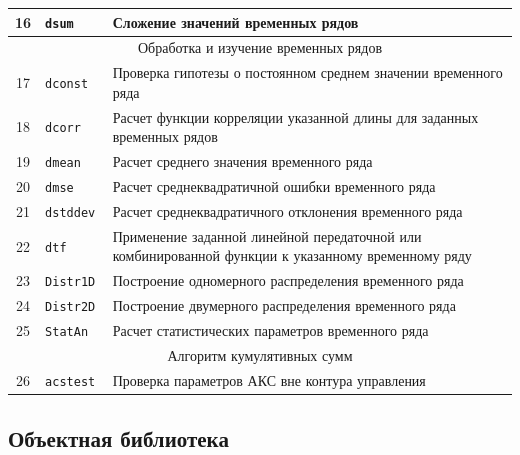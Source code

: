 \begin{table}
\begin{tabular}{|c|l|p{13cm}|}
16 & \tt dsum & Сложение значений временных рядов \\
\hline
\multicolumn{3}{|c|}{Обработка и изучение временных рядов} \\
\hline
17 & \tt dconst & Проверка гипотезы о постоянном среднем значении временного ряда \\
18 & \tt dcorr & Расчет функции корреляции указанной длины для заданных временных рядов \\
19 & \tt dmean & Расчет среднего значения временного ряда \\
20 & \tt dmse & Расчет среднеквадратичной ошибки временного ряда \\
21 & \tt dstddev & Расчет среднеквадратичного отклонения временного ряда \\
22 & \tt dtf & Применение заданной линейной передаточной или комбинированной функции к указанному временному ряду  \\
23 & \tt Distr1D & Построение одномерного распределения временного ряда \\
24 & \tt Distr2D & Построение двумерного распределения временного ряда \\
25 & \tt StatAn & Расчет статистических параметров временного ряда \\
\hline
\multicolumn{3}{|c|}{Алгоритм кумулятивных сумм} \\
\hline
26 & \tt acstest & Проверка параметров АКС вне контура управления \\
\hline
\end{tabular}
\end{table}


\subsection{Объектная библиотека}

